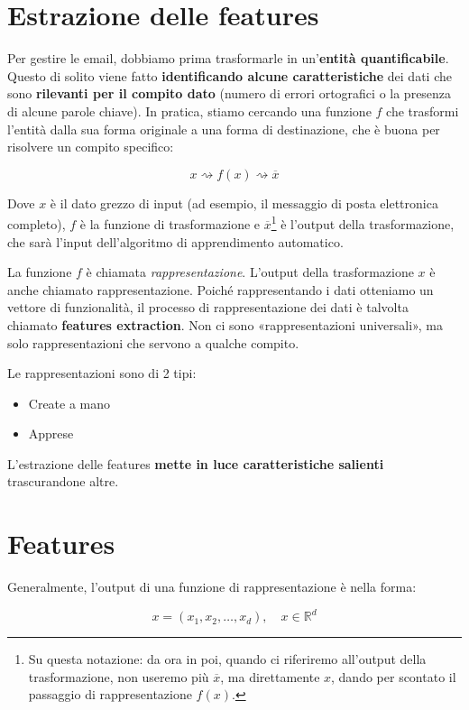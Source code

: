 \section{Estrazione delle features}

Per gestire le email, dobbiamo prima trasformarle in un'\textbf{entità quantificabile}. Questo di solito viene fatto \textbf{identificando alcune caratteristiche} dei dati che sono \textbf{rilevanti per il compito dato} (numero di errori ortografici o la presenza di alcune parole chiave). In pratica, stiamo cercando una funzione $f$ che trasformi l'entità dalla sua forma originale a una forma di destinazione, che è buona per risolvere un compito specifico:

$$
x \rightsquigarrow f(x) \rightsquigarrow \overline{x}
$$

Dove $x$ è il dato grezzo di input (ad esempio, il messaggio di posta elettronica completo), $f$ è la funzione di trasformazione e $\overline{x}$\footnote{Su questa notazione: da ora in poi, quando ci riferiremo all'output della trasformazione, non useremo più $\overline{x}$, ma direttamente $x$, dando per scontato il passaggio di rappresentazione $f(x)$.} è l'output della trasformazione, che sarà l'input dell'algoritmo di apprendimento automatico.

La funzione $f$ è chiamata \emph{rappresentazione}. L'output della trasformazione $x$ è anche chiamato rappresentazione.
Poiché rappresentando i dati otteniamo un vettore di funzionalità, il processo di rappresentazione dei dati è talvolta chiamato \textbf{features extraction}. Non ci sono «rappresentazioni universali», ma solo rappresentazioni che servono a qualche compito.

\noindent
Le rappresentazioni sono di 2 tipi:

\begin{itemize}
\item Create a mano
\item Apprese
\end{itemize}

\noindent
L'estrazione delle features \textbf{mette in luce caratteristiche salienti} trascurandone altre.

\section{Features}

Generalmente, l'output di una funzione di rappresentazione è nella forma:

$$
x = (x_1, x_2, \dots, x_d), \quad x \in \mathbb{R}^d
$$

